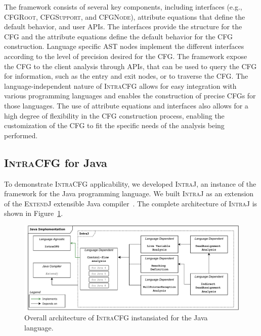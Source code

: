 The framework consists of several key components, including interfaces
(e.g., \textsc{CFGRoot}, \textsc{CFGSupport}, and \textsc{CFGNode}), attribute equations that define the
default behavior, and user APIs. The interfaces provide the structure for the
CFG and the attribute equations define the default behavior for the CFG
construction. Language specific AST nodes implement the different interfaces
according to the level of precision desired for the CFG.
The framework expose the CFG to the client analysis through APIs, that can be used
to query the CFG for information, such as the entry and exit nodes, or to traverse the CFG.
The language-independent nature of \textsc{IntraCFG} allows for easy integration
with various programming languages and enables the construction of precise CFGs
for those languages. The use of attribute equations and interfaces also allows
for a high degree of flexibility in the CFG construction process,
enabling the customization of the CFG to fit the specific needs of the
analysis being performed.






\subsection{\textsc{IntraCFG} for Java}
To demonstrate \textsc{IntraCFG} applicability, we developed
\textsc{IntraJ}, an instance of the framework for the Java programming language.
We built \textsc{IntraJ} as an extension of the \textsc{ExtendJ} extensible Java compiler~\cite{DBLP:conf/oopsla/EkmanH07}.
The complete architecture of \textsc{IntraJ} is shown in Figure~\ref{fig:intraJ}.
\begin{figure}[H]
    \centering
    \includegraphics[scale=0.52]{kappa/img/architecturejava.pdf}
    \caption{\label{fig:intraJ} Overall architecture of \textsc{IntraCFG} instansiated for the Java language.}
\end{figure}

